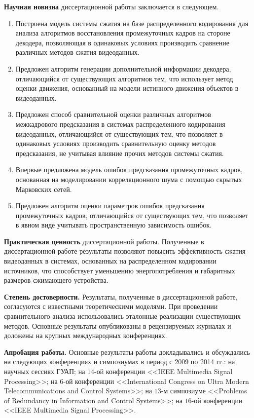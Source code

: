 \textbf{Научная новизна} диссертационной работы заключается в следующем.
\begin{enumerate}
\item Построена модель системы сжатия на базе распределенного кодирования для анализа алгоритмов восстановления промежуточных кадров на стороне декодера, позволяющая в одинаковых условиях производить сравнение различных методов сжатия видеоданных.
\item Предложен алгоритм генерации дополнительной информации декодера, отличающийся от существующих алгоритмов тем, что использует метод оценки движения, основанный на модели истинного движения объектов в видеоданных.
\item Предложен способ сравнительной оценки различных алгоритмов межкадрового предсказания в системах распределенного кодирования видеоданных, отличающийся от существующих тем, что позволяет в одинаковых условиях производить сравнительную оценку методов предсказания, не учитывая влияние прочих методов системы сжатия.
\item Впервые предложена модель ошибок предсказания промежуточных кадров, основанная на моделировании корреляционного шума с помощью скрытых Марковских сетей. 
\item Предложен алгоритм оценки параметров ошибок предсказания  промежуточных кадров, отличающийся от существующих тем, что позволяет в явном виде учитывать пространственную зависимость ошибок.
\end{enumerate}

\textbf{Практическая ценность} диссертационной работы. Полученные в диссертационной работе результаты позволяют повысить эффективность сжатия видеоданных в системах, основанных на распределенном кодировании источников, что способствует уменьшению энергопотребления и габаритных размеров сжимающего устройства.

\textbf{Степень достоверности.} Результаты, полученные в диссертационной работе, согласуются с известными теоретическими моделями. При проведении сравнительного анализа использовались эталонные реализации существующих методов. Основные результаты опубликованы в рецензируемых журналах и доложены на крупных международных конференциях.

\textbf{Апробация работы.} Основные результаты работы докладывались и обсуждались на следующих конференциях и симпозиумах в период с 2009 по 2014 гг.: на научных сессиях ГУАП; на $14$-ой конференции <<IEEE Multimedia Signal Processing>>; на $6$-ой конференции <<International Congress on Ultra Modern Telecommunications and Control Systems>>; на $13$-м симпозиуме <<Problems of Redundancy in Information and Control Systems>>; на $16$-ой конференции <<IEEE Multimedia Signal Processing>>.

